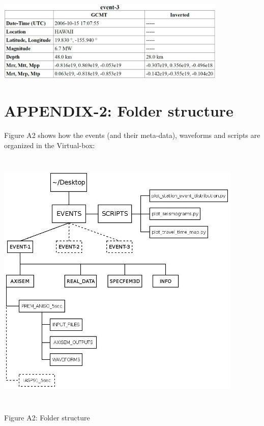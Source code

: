 \documentclass{article}
\begin{document}
\begin{center}
\vspace{1cm}
\includegraphics[width=312pt, height=110pt, keepaspectratio=true]{AXISEMTutorial-fig004.png}

\end{center}



\newpage

\section{APPENDIX-2: Folder structure}

Figure A2 shows how the events (and their meta-data), waveforms and scripts are
organized in the Virtual-box:

\begin{center}
\includegraphics[width=334pt, height=362pt, keepaspectratio=true]{Folder_structure.jpeg}

Figure A2: Folder structure
\end{center}
\end{document}
